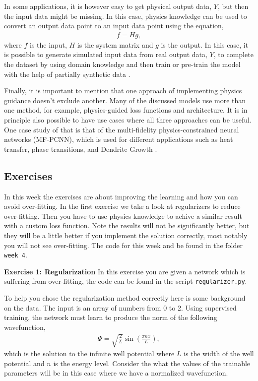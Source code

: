 \documentclass[12pt,a4paper]{article} %
\numberwithin{equation}{section}
\newcommand{\paa}[1]{\left(#1\right)}
\begin{document}
			In some applications, it is however easy to get physical output data, $Y$, but then the input data might be missing. In this case, physics knowledge can be used to convert an output data point to an input data point using the equation,
			\begin{gather}
				f = H g,
			\end{gather}
			where $f$ is the input, $H$ is the system matrix and $g$ is the output. In this case, it is possible to generate simulated input data from real output data, $Y$, to complete the dataset by using domain knowledge and then train or pre-train the model with the help of partially synthetic data \cite{ahlebæk:2022}.
			
			Finally, it is important to mention that one approach of implementing physics guidance doesn't exclude another. Many of the discussed models use more than one method, for example, physics-guided loss functions and architecture. It is in principle also possible to have use cases where all three approaches can be useful. One case study of that is that of the multi-fidelity physics-constrained neural networks (MF-PCNN), which is used for different applications such as heat transfer, phase transitions, and Dendrite Growth \cite{liu:2019}.
			
	\subsection{Exercises}
		In this week the exercises are about improving the learning and how you can avoid over-fitting. In the first exercise we take a look at regularizers to reduce over-fitting. Then you have to use physics knowledge to achive a similar result with a custom loss function. Note the results will not be significantly better, but they will be a little better if you implement the solution correctly, most notably you will not see over-fitting. The code for this week and be found in the folder \texttt{week 4}.\newline
		
		\textbf{Exercise 1: Regularization}\newline
		In this exercise you are given a network which is suffering from over-fitting, the code can be found in the script \texttt{regularizer.py}. 
		
		To help you chose the regularization method correctly here is some background on the data. The input is an array of numbers from 0 to 2. Using supervised training, the network must learn to produce the norm of the following wavefunction,
		\begin{gather}
			\Psi = \sqrt{\frac{2}{L}} \sin\paa{\frac{\pi n x}{L}},
		\end{gather}
		which is the solution to the infinite well potential where $L$ is the width of the well potential and $n$ is the energy level. Consider the what the values of the trainable parameters will be in this case where we have a normalized wavefunction.
		
\end{document}
